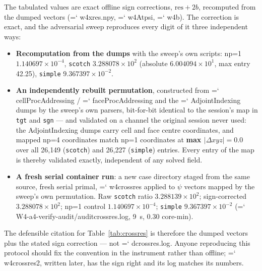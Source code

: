 \documentclass[11pt,a4paper]{article}
\newcommand{\artifact}[1]{{\small\ttfamily\hyphenchar\font=`\-\relax
  \def\_{\textunderscore\allowbreak}#1}}
\begin{document}
The tabulated values are exact offline sign corrections, \(\mathrm{res} + 2b\), recomputed
from the dumped vectors (\artifact{w4x\_res\_*.npy}, \artifact{w4\_Atpsi}, \artifact{w4\_b}).
The correction is exact, and the adversarial sweep reproduces every digit of it three
independent ways:

\begin{itemize}
\item \textbf{Recomputation from the dumps} with the sweep's own scripts: np=1
\(1.140697\times10^{-4}\), \texttt{scotch} \(3.288078\times10^{2}\) (absolute
\(6.004094\times10^{1}\), max entry 42.25), \texttt{simple} \(9.367397\times10^{-2}\).
\item \textbf{An independently rebuilt permutation}, constructed from
\artifact{cellProcAddressing} / \artifact{faceProcAddressing} and the
\artifact{AdjointIndexing} dumps by the sweep's own parsers, bit-for-bit identical to the
session's map in \texttt{tgt} and \texttt{sgn} --- and validated on a channel the original
session never used: the AdjointIndexing dumps carry cell and face centre coordinates, and
mapped np=4 coordinates match np=1 coordinates at \textbf{max \(\lvert\Delta xyz\rvert =
0.0\)} over all 26{,}149 (\texttt{scotch}) and 26{,}227 (\texttt{simple}) entries. Every entry
of the map is thereby validated exactly, independent of any solved field.
\item \textbf{A fresh serial container run}: a new case directory staged from the same
source, fresh serial primal, \artifact{w4\_crossres} applied to \(\psi\) vectors mapped by
the sweep's own permutation. Raw \texttt{scotch} ratio \(3.288139\times10^{2}\);
sign-corrected \(3.288078\times10^{2}\); np=1 control \(1.140697\times10^{-4}\);
\texttt{simple} \(9.367397\times10^{-2}\)
(\artifact{W4-a4-verify-audit/audit\_crossres.log}, 9~s, 0.30 core-min).
\end{itemize}

\noindent
The defensible citation for Table~\ref{tab:crossres} is therefore the dumped vectors plus the
stated sign correction --- not \artifact{d\_crossres.log}. Anyone reproducing this protocol
should fix the convention in the instrument rather than offline; \artifact{w4\_crossres2},
written later, has the sign right and its log matches its numbers.
\end{document}
